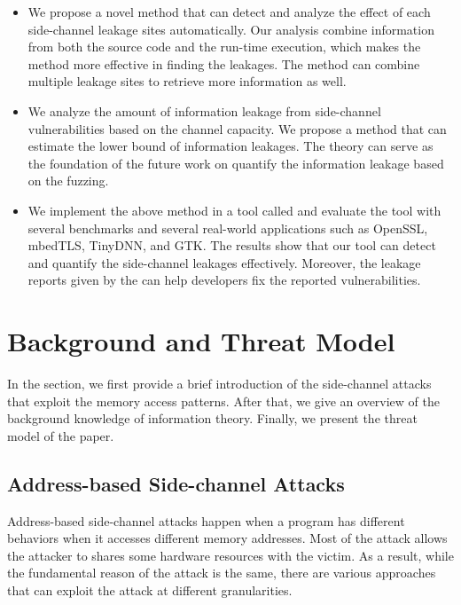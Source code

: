 \begin{itemize}

  \item We propose a novel method that can detect and analyze the effect of each side-channel leakage sites automatically. Our analysis combine information from both the source code and the run-time execution, which makes the method more effective in finding the leakages. The method can combine multiple leakage sites to retrieve more information as well.

  \item We analyze the amount of information leakage from side-channel vulnerabilities based on the channel capacity. We propose a method that can estimate the lower bound of information leakages. The theory can serve as the foundation of the future work on quantify the information leakage based on the fuzzing.

  \item We implement the above method in a tool called \tool{} and evaluate the tool with several benchmarks and several real-world applications such as OpenSSL, mbedTLS, TinyDNN, and GTK. The results show that our tool can detect and quantify the side-channel leakages effectively. Moreover, the leakage reports given by the \tool{} can help developers fix the reported vulnerabilities.
\end{itemize}

\section{Background and Threat Model}
In the section, we first provide a brief introduction of the side-channel attacks that exploit the memory access patterns. After that, we give an overview of the background knowledge of information theory. Finally, we present the threat model of the paper.

\subsection{Address-based Side-channel Attacks}
Address-based side-channel attacks happen when a program has different behaviors when it accesses different memory addresses. Most of the attack allows the attacker to shares some hardware resources with the victim. As a result, while the fundamental reason of the attack is the same, there are various approaches that can exploit the attack at different granularities.

